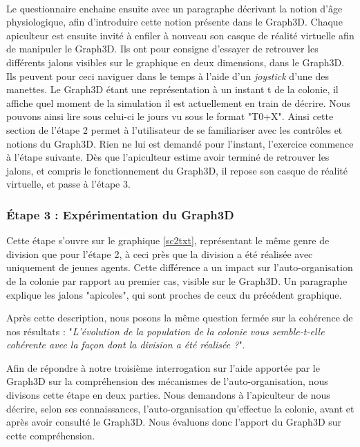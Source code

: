 		\paragraph{}
		Le questionnaire enchaine ensuite avec un paragraphe décrivant la notion d'âge physiologique, afin d'introduire cette notion présente dans le Graph3D. Chaque apiculteur est ensuite invité à enfiler à nouveau son casque de réalité virtuelle afin de manipuler le Graph3D. Ils ont pour consigne d'essayer de retrouver les différents jalons visibles sur le graphique en deux dimensions, dans le Graph3D. Ils peuvent pour ceci naviguer dans le temps à l'aide d'un \textit{joystick} d'une des manettes. Le Graph3D étant une représentation à un instant t de la colonie, il affiche quel moment de la simulation il est actuellement en train de décrire. Nous pouvons ainsi lire sous celui-ci le jours vu sous le format "T0+X". Ainsi cette section de l'étape 2 permet à l'utilisateur de se familiariser avec les contrôles et notions du Graph3D. Rien ne lui est demandé pour l'instant, l'exercice commence à l'étape suivante. Dès que l'apiculteur estime avoir terminé de retrouver les jalons, et compris le fonctionnement du Graph3D, il repose son casque de réalité virtuelle, et passe à l'étape 3.
		
		\subsubsection{Étape 3 : Expérimentation du Graph3D}
			Cette étape s'ouvre sur le graphique \ref{sc2txt}, représentant le même genre de division que pour l'étape 2, à ceci près que la division a été réalisée avec uniquement de jeunes agents. Cette différence a un impact sur l'auto-organisation de la colonie par rapport au premier cas, visible sur le Graph3D. Un paragraphe explique les jalons "apicoles", qui sont proches de ceux du précédent graphique.
			
			Après cette description, nous posons la même question fermée sur la cohérence de nos résultats : "\textit{L'évolution de la population de la colonie vous semble-t-elle cohérente avec la façon dont la division a été réalisée ?}".
			
			Afin de répondre à notre troisième interrogation sur l'aide apportée par le Graph3D sur la compréhension des mécanismes de l'auto-organisation, nous divisons cette étape en deux parties. Nous demandons à l'apiculteur de nous décrire, selon ses connaissances, l'auto-organisation qu'effectue la colonie, avant et après avoir consulté le Graph3D. Nous évaluons donc l'apport du Graph3D sur cette compréhension.
			
